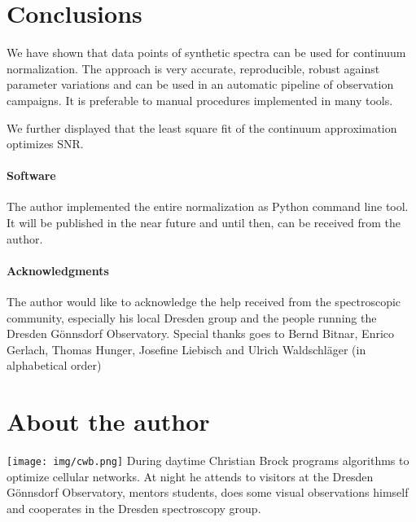 \documentclass[10pt,a4paper,notitlepage,twocolumn]{article}
\begin{document}
\section{Conclusions}

We have shown that data points of synthetic spectra can be used for continuum normalization. The approach is very accurate, reproducible, robust against parameter variations and can be used in an automatic pipeline of observation campaigns.
It is preferable to manual procedures implemented in many tools.

We further displayed that the least square fit of the continuum approximation optimizes SNR.

\paragraph{Software}
The author implemented the entire normalization as Python command line tool.
It will be published in the near future and until then, can be received from the author.

\paragraph{Acknowledgments}
The author would like to acknowledge the help received from the spectroscopic community, especially his local Dresden group and the people running the Dresden Gönnsdorf Observatory. Special thanks goes to Bernd Bitnar, Enrico Gerlach, Thomas Hunger, Josefine Liebisch and Ulrich Waldschläger (in alphabetical order)




\section*{About the author}
\texttt{[image: img/cwb.png]}
During daytime Christian Brock programs algorithms to optimize cellular networks.
At night he attends to visitors at the Dresden Gönnsdorf Observatory, mentors students, does some visual observations himself and cooperates in the Dresden spectroscopy group.
\end{document}
